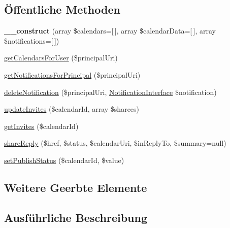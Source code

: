 \subsection*{Öffentliche Methoden}
\begin{DoxyCompactItemize}
\item 
\mbox{\label{class_sabre_1_1_cal_d_a_v_1_1_backend_1_1_mock_sharing_a408506db952e5b53fde3a99da4557a48}} 
{\bfseries \+\_\+\+\_\+construct} (array \$calendars=\mbox{[}$\,$\mbox{]}, array \$calendar\+Data=\mbox{[}$\,$\mbox{]}, array \$notifications=\mbox{[}$\,$\mbox{]})
\item 
\mbox{\hyperlink{class_sabre_1_1_cal_d_a_v_1_1_backend_1_1_mock_sharing_a7cc6409f0296b256ee8132d5179afc21}{get\+Calendars\+For\+User}} (\$principal\+Uri)
\item 
\mbox{\hyperlink{class_sabre_1_1_cal_d_a_v_1_1_backend_1_1_mock_sharing_a826daec9d320900a4b0c5d18cd53f82b}{get\+Notifications\+For\+Principal}} (\$principal\+Uri)
\item 
\mbox{\hyperlink{class_sabre_1_1_cal_d_a_v_1_1_backend_1_1_mock_sharing_aa3e5c69e15c12111c779ffeda8511361}{delete\+Notification}} (\$principal\+Uri, \mbox{\hyperlink{interface_sabre_1_1_cal_d_a_v_1_1_xml_1_1_notification_1_1_notification_interface}{Notification\+Interface}} \$notification)
\item 
\mbox{\hyperlink{class_sabre_1_1_cal_d_a_v_1_1_backend_1_1_mock_sharing_a2a87bd1cd094d478cb880c9ed5ac9b09}{update\+Invites}} (\$calendar\+Id, array \$sharees)
\item 
\mbox{\hyperlink{class_sabre_1_1_cal_d_a_v_1_1_backend_1_1_mock_sharing_a00ec7859036057a4ebce446f169a60b6}{get\+Invites}} (\$calendar\+Id)
\item 
\mbox{\hyperlink{class_sabre_1_1_cal_d_a_v_1_1_backend_1_1_mock_sharing_a5ac03b4237d34ab9fcd5e5dc7414b83e}{share\+Reply}} (\$href, \$status, \$calendar\+Uri, \$in\+Reply\+To, \$summary=null)
\item 
\mbox{\hyperlink{class_sabre_1_1_cal_d_a_v_1_1_backend_1_1_mock_sharing_a27430bb5fc8c5bc917fd54dca083f069}{set\+Publish\+Status}} (\$calendar\+Id, \$value)
\end{DoxyCompactItemize}
\subsection*{Weitere Geerbte Elemente}


\subsection{Ausführliche Beschreibung}


